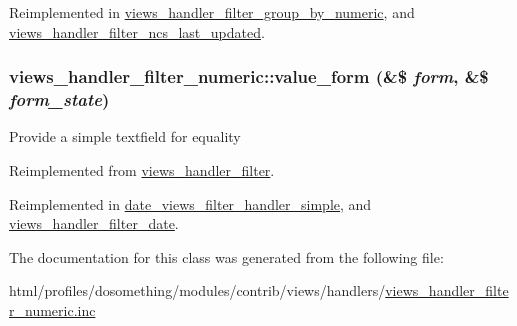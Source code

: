 Reimplemented in \hyperlink{classviews__handler__filter__group__by__numeric_a8d87dd77b6df159704256e7ff452c8ce}{views\_\-handler\_\-filter\_\-group\_\-by\_\-numeric}, and \hyperlink{classviews__handler__filter__ncs__last__updated_afdcfcb18506212eb4b5df8b19971ff48}{views\_\-handler\_\-filter\_\-ncs\_\-last\_\-updated}.\hypertarget{classviews__handler__filter__numeric_ab0888218590f7c620f10fc04a98d135e}{
\subsubsection[{value\_\-form}]{\setlength{\rightskip}{0pt plus 5cm}views\_\-handler\_\-filter\_\-numeric::value\_\-form (\&\$ {\em form}, \/  \&\$ {\em form\_\-state})}}
\label{classviews__handler__filter__numeric_ab0888218590f7c620f10fc04a98d135e}
Provide a simple textfield for equality 

Reimplemented from \hyperlink{classviews__handler__filter_a9168b39edae84b20e01a3fd0d810ba66}{views\_\-handler\_\-filter}.

Reimplemented in \hyperlink{classdate__views__filter__handler__simple_a59232ef0a63cc9cf0a4a702ea6b06f12}{date\_\-views\_\-filter\_\-handler\_\-simple}, and \hyperlink{classviews__handler__filter__date_a5c7fb298feef092a2cb3bc3f75f54f29}{views\_\-handler\_\-filter\_\-date}.

The documentation for this class was generated from the following file:\begin{DoxyCompactItemize}
\item 
html/profiles/dosomething/modules/contrib/views/handlers/\hyperlink{views__handler__filter__numeric_8inc}{views\_\-handler\_\-filter\_\-numeric.inc}\end{DoxyCompactItemize}
